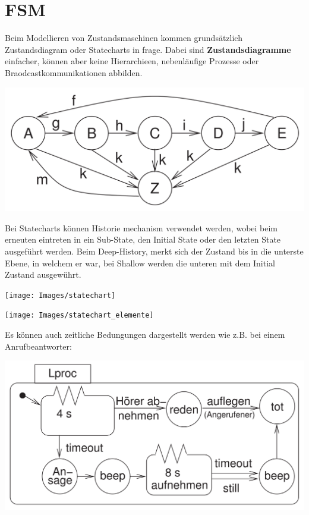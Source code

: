 \section{FSM}
Beim Modellieren von Zustandsmaschinen kommen grundsätzlich Zustandsdiagram oder Statecharts in frage. 
Dabei sind \textbf{Zustandsdiagramme} einfacher, können aber keine Hierarchieen, nebenläufige Prozesse oder Braodcastkommunikationen abbilden.
\begin{center}
	\includegraphics[width=0.8\columnwidth]{Images/zustandsdiagramm}
\end{center}


Bei Statecharts können Historie mechanism verwendet werden, wobei beim erneuten eintreten in ein Sub-State, den Initial State oder den letzten State ausgeführt werden. Beim Deep-History, merkt sich der Zustand bis in die unterste Ebene, in welchem er war, bei Shallow werden die unteren mit dem Initial Zustand ausgewührt.
\begin{center}
	\texttt{[image: Images/statechart]}
\end{center}

\begin{center}
	\texttt{[image: Images/statechart\_elemente]}
\end{center}

Es können auch zeitliche Bedungungen dargestellt werden wie z.B. bei einem Anrufbeantworter:
\begin{center}
	\includegraphics[width=0.8\columnwidth]{Images/fsm_timers.png}
\end{center}

